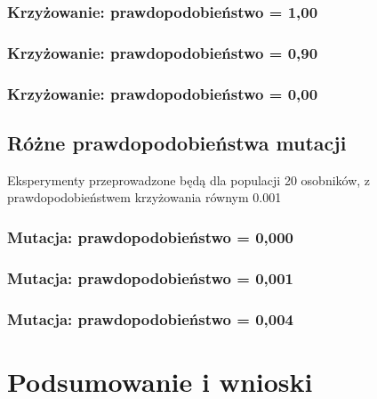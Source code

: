 \documentclass[a4paper,11pt]{article}
\begin{document}
				\subsubsection{Krzyżowanie: prawdopodobieństwo = 1,00}
				\subsubsection{Krzyżowanie: prawdopodobieństwo = 0,90}
				\subsubsection{Krzyżowanie: prawdopodobieństwo = 0,00}
			\subsection{Różne prawdopodobieństwa mutacji}
				Eksperymenty przeprowadzone będą dla populacji 20 osobników, z prawdopodobieństwem krzyżowania równym 0.001
				\subsubsection{Mutacja: prawdopodobieństwo = 0,000}
				\subsubsection{Mutacja: prawdopodobieństwo = 0,001}
				\subsubsection{Mutacja: prawdopodobieństwo = 0,004}
	\section{Podsumowanie i wnioski}
	
\end{document}
